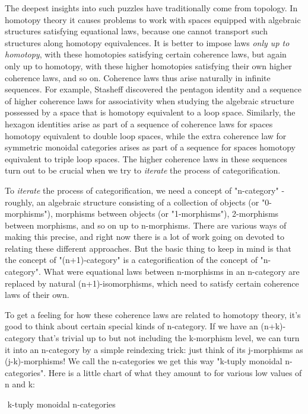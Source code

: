 The deepest insights into such puzzles have traditionally come from
topology.  In homotopy theory it causes problems to work with spaces
equipped with algebraic structures satisfying equational laws, because
one cannot transport such structures along homotopy equivalences.  It
is better to impose laws \emph{only up to homotopy}, with these homotopies
satisfying certain coherence laws, but again only up to homotopy, with
these higher homotopies satisfying their own higher coherence laws,
and so on.  Coherence laws thus arise naturally in infinite sequences.
For example, Stasheff discovered the pentagon identity and a sequence
of higher coherence laws for associativity when studying the algebraic
structure possessed by a space that is homotopy equivalent to a loop
space.  Similarly, the hexagon identities arise as part of a sequence
of coherence laws for spaces homotopy equivalent to double loop
spaces, while the extra coherence law for symmetric monoidal
categories arises as part of a sequence for spaces homotopy equivalent
to triple loop spaces.  The higher coherence laws in these sequences
turn out to be crucial when we try to \emph{iterate} the process of
categorification.

To \emph{iterate} the process of categorification, we need a concept of
"n-category" - roughly, an algebraic structure consisting of a
collection of objects (or "0-morphisms"), morphisms between objects
(or "1-morphisms"), 2-morphisms between morphisms, and so on up to
n-morphisms.  There are various ways of making this precise, and right
now there is a lot of work going on devoted to relating these
different approaches.  But the basic thing to keep in mind is that
the concept of "(n+1)-category" is a categorification of the concept
of "n-category".  
What were equational laws between n-morphisms in
an n-category are replaced by natural (n+1)-isomorphisms, which need
to satisfy certain coherence laws of their own.

To get a feeling for how these coherence laws are related to homotopy
theory, it's good to think about certain special kinds of n-category.
If we have an (n+k)-category that's trivial up to but not including
the k-morphism level, we can turn it into an n-category by a simple
reindexing trick: just think of its j-morphisms as (j-k)-morphisms!
We call the n-categories we get this way "k-tuply monoidal 
n-categories".  Here is a little chart of what they amount to for
various low values of n and k:

$$
                   k-tuply monoidal n-categories 

